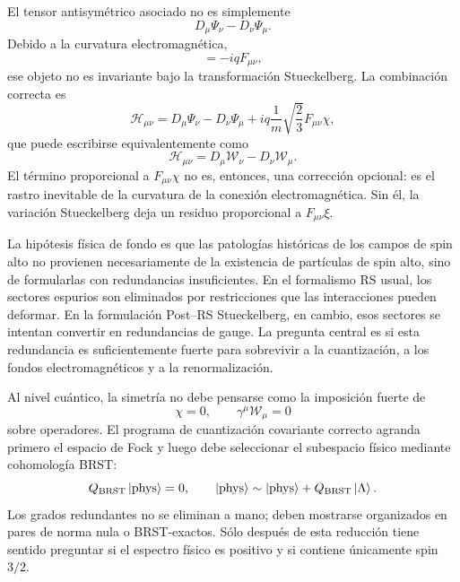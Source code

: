 \documentclass[11pt,a4paper]{article}
\numberwithin{equation}{section}
\newcommand{\Wcal}{\mathcal W}
\newcommand{\Hcal}{\mathcal H}
\begin{document}
El tensor antisymétrico asociado no es simplemente
\begin{equation}
  D_\mu\Psi_\nu-D_\nu\Psi_\mu.
\end{equation}
Debido a la curvatura electromagnética,
\begin{equation}
  [D_\mu,D_\nu]=-iqF_{\mu\nu},
\end{equation}
ese objeto no es invariante bajo la transformación Stueckelberg. La combinación correcta
es
\begin{equation}
  \Hcal_{\mu\nu}
  =
  D_\mu\Psi_\nu-D_\nu\Psi_\mu
  +iq\frac1m\sqrt{\frac23}F_{\mu\nu}\chi,
\end{equation}
que puede escribirse equivalentemente como
\begin{equation}
  \Hcal_{\mu\nu}
  =
  D_\mu\Wcal_\nu-D_\nu\Wcal_\mu .
\end{equation}
El término proporcional a $F_{\mu\nu}\chi$ no es, entonces, una corrección opcional:
es el rastro inevitable de la curvatura de la conexión electromagnética. Sin él, la variación
Stueckelberg deja un residuo proporcional a $F_{\mu\nu}\xi$.

La hipótesis física de fondo es que las patologías históricas de los campos de spin alto
no provienen necesariamente de la existencia de partículas de spin alto, sino de formularlas
con redundancias insuficientes. En el formalismo RS usual, los sectores espurios son
eliminados por restricciones que las interacciones pueden deformar. En la formulación
Post--RS Stueckelberg, en cambio, esos sectores se intentan convertir en redundancias
de gauge. La pregunta central es si esta redundancia es suficientemente fuerte para
sobrevivir a la cuantización, a los fondos electromagnéticos y a la renormalización.

Al nivel cuántico, la simetría no debe pensarse como la imposición fuerte de
\begin{equation}
  \chi=0,
  \qquad
  \gamma^\mu\Wcal_\mu=0
\end{equation}
sobre operadores. El programa de cuantización covariante correcto agranda primero el espacio de
Fock y luego debe seleccionar el subespacio físico mediante cohomología BRST:
\begin{equation}
  Q_{\rm BRST}\ket{\mathrm{phys}}=0,
  \qquad
  \ket{\mathrm{phys}}\sim
  \ket{\mathrm{phys}}+Q_{\rm BRST}\ket{\Lambda}.
\end{equation}
Los grados redundantes no se eliminan a mano; deben mostrarse organizados en pares de norma
nula o BRST-exactos. Sólo después de esta reducción tiene sentido preguntar si el espectro
físico es positivo y si contiene únicamente spin $3/2$.
\end{document}
